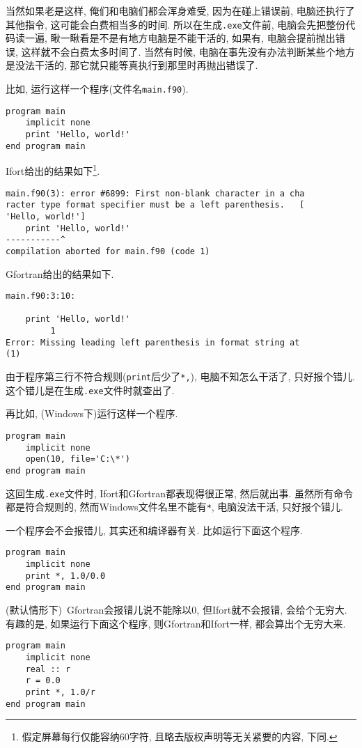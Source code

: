 当然如果老是这样, 俺们和电脑们都会浑身难受, 因为在碰上错误前, 电脑还执行了其他指令, 这可能会白费相当多的时间. 所以在生成\texttt{.exe}文件前, 电脑会先把整份代码读一遍, 瞅一瞅看是不是有地方电脑是不能干活的, 如果有, 电脑会提前抛出错误, 这样就不会白费太多时间了. 当然有时候, 电脑在事先没有办法判断某些个地方是没法干活的, 那它就只能等真执行到那里时再抛出错误了.

比如, 运行这样一个程序(文件名\texttt{main.f90}).
\begin{lstlisting}
program main
    implicit none
    print 'Hello, world!'
end program main
\end{lstlisting}

Ifort给出的结果如下\footnote{
    假定屏幕每行仅能容纳60字符, 且略去版权声明等无关紧要的内容, 下同.
}.
\begin{lstlisting}
main.f90(3): error #6899: First non-blank character in a cha
racter type format specifier must be a left parenthesis.   [
'Hello, world!']
    print 'Hello, world!'
-----------^
compilation aborted for main.f90 (code 1)
\end{lstlisting}

Gfortran给出的结果如下.
\begin{lstlisting}
main.f90:3:10:

    print 'Hello, world!'
         1
Error: Missing leading left parenthesis in format string at 
(1)
\end{lstlisting}

由于程序第三行不符合规则(\texttt{print}后少了\texttt{*,}), 电脑不知怎么干活了, 只好报个错儿. 这个错儿是在生成\texttt{.exe}文件时就查出了.

再比如, (Windows下)运行这样一个程序.
\begin{lstlisting}
program main
    implicit none
    open(10, file='C:\*')
end program main
\end{lstlisting}

这回生成\texttt{.exe}文件时, Ifort和Gfortran都表现得很正常, 然后就出事. 虽然所有命令都是符合规则的, 然而Windows文件名里不能有\texttt{*}, 电脑没法干活, 只好报个错儿.

一个程序会不会报错儿, 其实还和编译器有关. 比如运行下面这个程序.
\begin{lstlisting}
program main
    implicit none
    print *, 1.0/0.0
end program main
\end{lstlisting}
(默认情形下)~Gfortran会报错儿说不能除以0, 但Ifort就不会报错, 会给个无穷大. 有趣的是, 如果运行下面这个程序, 则Gfortran和Ifort一样, 都会算出个无穷大来.
\begin{lstlisting}
program main
    implicit none
    real :: r
    r = 0.0
    print *, 1.0/r
end program main
\end{lstlisting}

